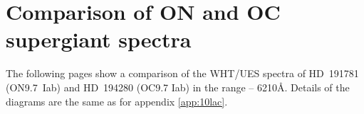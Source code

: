 \chapter{Comparison of ON and OC supergiant spectra}
\label{app:ocn}

The following pages show a comparison of the WHT/UES spectra of
HD~191781 (ON9.7~Iab) and HD~194280 (OC9.7 Iab) in the range
\lam{} -- 6210\AA. Details of the diagrams are the same as for
appendix \ref{app:10lac}.

\newpage

\epsfxsize=15cm


\newpage

\epsfxsize=15cm

\newpage

\epsfxsize=15cm

\newpage

\epsfxsize=15cm

\newpage

\epsfxsize=15cm

